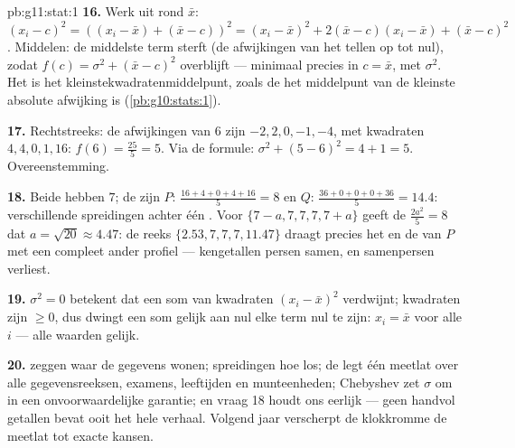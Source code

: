 \begin{solution}{pb:g11:stat:1}
\textbf{16.} Werk uit rond $\bar x$:
$(x_i - c)^2 = \left((x_i - \bar x) + (\bar x - c)\right)^2
= (x_i - \bar x)^2 + 2(\bar x - c)(x_i - \bar x) + (\bar x - c)^2$.
Middelen: de middelste term sterft (de afwijkingen van het  tellen
op tot nul), zodat $f(c) = \sigma^2 + (\bar x - c)^2$ overblijft --- minimaal
precies in $c = \bar x$, met  $\sigma^2$. Het  is het
kleinstekwadratenmiddelpunt, zoals de  het middelpunt van de kleinste
absolute afwijking is (\cref{pb:g10:stats:1}).

\textbf{17.} Rechtstreeks: de afwijkingen van $6$ zijn $-2, 2, 0, -1, -4$,
met kwadraten $4, 4, 0, 1, 16$: $f(6) = \frac{25}{5} = 5$. Via de formule:
$\sigma^2 + (5 - 6)^2 = 4 + 1 = 5$. Overeenstemming.

\textbf{18.} Beide hebben  $7$; de  zijn
$P$: $\frac{16 + 4 + 0 + 4 + 16}{5} = 8$ en
$Q$: $\frac{36 + 0 + 0 + 0 + 36}{5} = 14.4$: verschillende spreidingen
achter één . Voor $\{7 - a, 7, 7, 7, 7 + a\}$ geeft de 
$\frac{2a^2}{5} = 8$ dat $a = \sqrt{20} \approx 4.47$: de reeks
$\{2.53, 7, 7, 7, 11.47\}$ draagt precies het  en de  van
$P$ met een compleet ander profiel --- kengetallen persen samen, en
samenpersen verliest.

\textbf{19.} $\sigma^2 = 0$ betekent dat een som van kwadraten
$(x_i - \bar x)^2$ verdwijnt; kwadraten zijn $\geq 0$, dus dwingt een som
gelijk aan nul elke term nul te zijn: $x_i = \bar x$ voor alle $i$ --- alle
waarden gelijk.

\textbf{20.}  zeggen waar de gegevens wonen; spreidingen hoe los; de
 legt één meetlat over alle gegevensreeksen, examens, leeftijden en
munteenheden; Chebyshev zet $\sigma$ om in een onvoorwaardelijke garantie; en
vraag 18 houdt ons eerlijk --- geen handvol getallen bevat ooit het hele
verhaal. Volgend jaar verscherpt de klokkromme de meetlat tot exacte kansen.
\end{solution}
